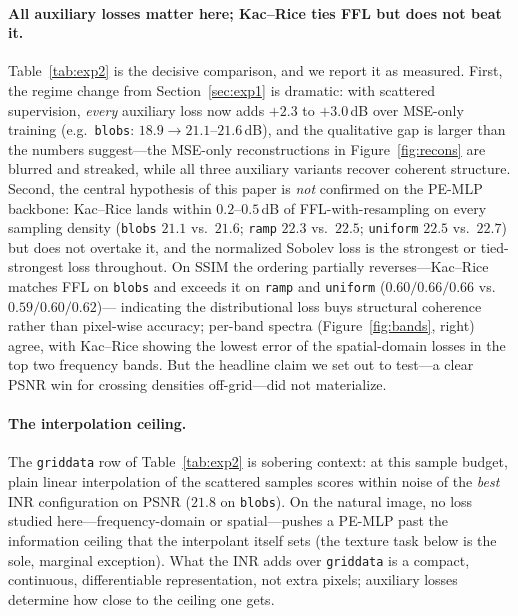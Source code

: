 \documentclass[10pt]{article}
\begin{document}
\paragraph{All auxiliary losses matter here; Kac--Rice ties FFL but does not beat it.}
Table~\ref{tab:exp2} is the decisive comparison, and we report it as measured. First,
the regime change from Section~\ref{sec:exp1} is dramatic: with scattered supervision,
\emph{every} auxiliary loss now adds $+2.3$ to $+3.0$\,dB over MSE-only training
(e.g.\ \texttt{blobs}: $18.9\to21.1$--$21.6$\,dB), and the qualitative gap is larger
than the numbers suggest---the MSE-only reconstructions in Figure~\ref{fig:recons} are
blurred and streaked, while all three auxiliary variants recover coherent structure.
Second, the central hypothesis of this paper is \emph{not} confirmed on the PE-MLP
backbone: Kac--Rice lands within $0.2$--$0.5$\,dB of FFL-with-resampling on every
sampling density (\texttt{blobs} $21.1$ vs.\ $21.6$; \texttt{ramp} $22.3$ vs.\ $22.5$;
\texttt{uniform} $22.5$ vs.\ $22.7$) but does not overtake it, and the normalized
Sobolev loss is the strongest or tied-strongest loss throughout. On SSIM the ordering
partially reverses---Kac--Rice matches FFL on \texttt{blobs} and exceeds it on
\texttt{ramp} and \texttt{uniform} ($0.60/0.66/0.66$ vs.\ $0.59/0.60/0.62$)---%
indicating the distributional loss buys structural coherence rather than pixel-wise
accuracy; per-band spectra (Figure~\ref{fig:bands}, right) agree,
with Kac--Rice showing the lowest error of the spatial-domain losses in the top two
frequency bands. But the headline claim we set out to test---a clear PSNR win for
crossing densities off-grid---did not materialize.

\paragraph{The interpolation ceiling.} The \texttt{griddata} row of
Table~\ref{tab:exp2} is sobering context: at this sample budget, plain linear
interpolation of the scattered samples scores within noise of the \emph{best} INR
configuration on PSNR ($21.8$ on \texttt{blobs}). On the natural image, no loss
studied here---frequency-domain or spatial---pushes a PE-MLP past the information
ceiling that the interpolant itself sets (the texture task below is the sole,
marginal exception). What the INR adds over \texttt{griddata} is a compact,
continuous, differentiable representation, not extra pixels; auxiliary losses determine
how close to the ceiling one gets.
\end{document}
